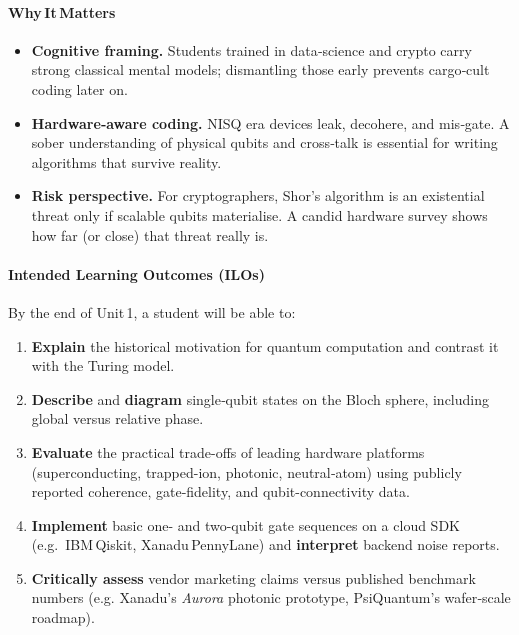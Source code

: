\documentclass[11pt,a4paper]{article}
\begin{document}
\paragraph{Why It Matters}
\begin{itemize}
	\item \textbf{Cognitive framing.}  Students trained in data‑science and crypto carry strong classical mental models; dismantling those early prevents cargo‑cult coding later on.
	\item \textbf{Hardware‑aware coding.}  NISQ era devices leak, decohere, and mis‑gate.  A sober understanding of physical qubits and cross‑talk is essential for writing algorithms that survive reality.
	\item \textbf{Risk perspective.}  For cryptographers, Shor’s algorithm is an existential threat only if scalable qubits materialise.  A candid hardware survey shows how far (or close) that threat really is.
\end{itemize}

\paragraph{Intended Learning Outcomes (ILOs)}
By the end of Unit 1, a student will be able to:
\begin{enumerate}
	\item \textbf{Explain} the historical motivation for quantum computation and contrast it with the Turing model.
	\item \textbf{Describe} and \textbf{diagram} single‑qubit states on the Bloch sphere, including global versus relative phase.
	\item \textbf{Evaluate} the practical trade-offs of leading hardware platforms (superconducting, trapped-ion, photonic, neutral‑atom) using publicly reported coherence, gate‑fidelity, and qubit-connectivity data.
	\item \textbf{Implement} basic one- and two-qubit gate sequences on a cloud SDK (e.g.\ IBM Qiskit, Xanadu PennyLane) and \textbf{interpret} backend noise reports.
	\item \textbf{Critically assess} vendor marketing claims versus published benchmark numbers (e.g. Xanadu’s \emph{Aurora} photonic prototype, PsiQuantum’s wafer‑scale roadmap).
\end{enumerate}

\end{document}
